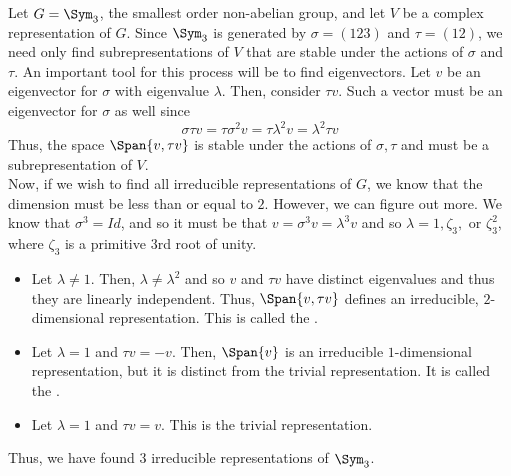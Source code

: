 \documentclass[11pt,leqno,oneside]{amsbook}
\numberwithin{thm}{section}
\begin{document}
\begin{example}
  Let \(G=\Sym_3\), the smallest order non-abelian group, and let
  \(V\) be a complex representation of \(G\). Since \(\Sym_3\) is
  generated by \(\sigma = (123)\) and \(\tau = (12)\), we need only
  find subrepresentations of \(V\) that are stable under the actions
  of \(\sigma\) and \(\tau\). An important tool for this process will
  be to find eigenvectors. Let \(v\) be an eigenvector for
  \(\sigma\) with eigenvalue \(\lambda\). Then, consider \(\tau
  v\). Such a vector must be an 
  eigenvector for \(\sigma\) as well since \[
    \sigma \tau v = \tau \sigma^2 v = \tau \lambda^2 v = \lambda^2
    \tau v
  \]
  Thus, the space \(\Span \{v,\tau v\}\) is stable under the actions of
  \(\sigma,\tau\) and must be a subrepresentation of \(V\). \\

  Now, if we wish to find all irreducible representations of \(G\), we
  know that the dimension must be less than or equal to
  \(2\). However, we can figure out more. We know that \(\sigma^3 =
  Id\), and so it must be that \(v = \sigma^3 v = \lambda^3 v\) and so
  \(\lambda = 1, \zeta_3,\) or \(\zeta_3^2\), where \(\zeta_3\) is a
  primitive \(3\)rd root of unity.
  \begin{itemize}
  \item Let \(\lambda \neq 1\). Then, \(\lambda \neq \lambda^2\) and
    so \(v\) and \(\tau v\) have distinct eigenvalues and thus they
    are linearly independent. Thus, \(\Span\{v,\tau v\}\) defines an
    irreducible, \(2\)-dimensional representation. This is called the
    .
  \item Let \(\lambda = 1\) and \(\tau v = -v\). Then, \(\Span\{v\}\)
    is an irreducible \(1\)-dimensional representation, but it is
    distinct from the trivial representation. It is called the
    .
  \item Let \(\lambda = 1\) and \(\tau v = v\). This is the trivial
    representation. 
  \end{itemize}
  Thus, we have found \(3\) irreducible representations of
  \(\Sym_3\).
\end{example}
\end{document}
